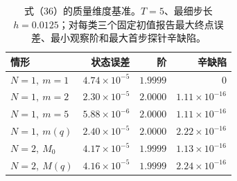 \begin{table}[t]
\centering\small\setlength{\tabcolsep}{3pt}
\caption{式（36）的质量维度基准。$T=5$、最细步长$h=0.0125$；对每类三个固定初值报告最大终点误差、最小观察阶和最大首步探针辛缺陷。}
\label{tab:eq36_mass_dimension}
\begin{tabular}{lrrr}
\toprule
情形 & 状态误差 & 阶 & 辛缺陷\\
\midrule
$N=1,\ m=1$ & $4.74\times10^{-5}$ & $1.9999$ & $0$ \\
$N=1,\ m=2$ & $2.30\times10^{-5}$ & $2.0000$ & $1.11\times10^{-16}$ \\
$N=1,\ m=5$ & $5.88\times10^{-6}$ & $2.0000$ & $1.11\times10^{-16}$ \\
$N=1,\ m(q)$ & $2.40\times10^{-5}$ & $2.0000$ & $2.22\times10^{-16}$ \\
$N=2,\ M_0$ & $4.17\times10^{-5}$ & $1.9999$ & $1.13\times10^{-16}$ \\
$N=2,\ M(q)$ & $4.16\times10^{-5}$ & $1.9999$ & $2.24\times10^{-16}$ \\
\bottomrule
\end{tabular}
\end{table}
